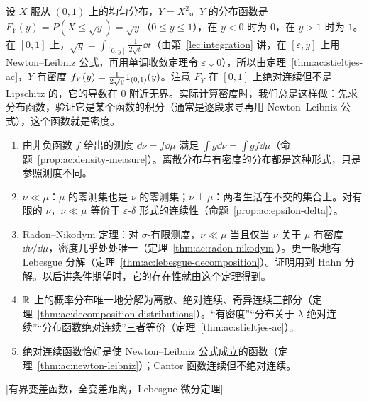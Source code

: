 \begin{example}
设 $X$ 服从 $(0,1)$ 上的均匀分布，$Y=X^2$。$Y$ 的分布函数是 $F_Y(y)=P(X\leqslant\sqrt y)=\sqrt y$（$0\leqslant y\leqslant1$），在 $y<0$ 时为 $0$，在 $y>1$ 时为 $1$。在 $[0,1]$ 上，$\sqrt y=\int_{[0,y]}\frac1{2\sqrt t}\dd t$（由第~\ref{lec:integration} 讲，在 $[\varepsilon,y]$ 上用 Newton--Leibniz 公式，再用单调收敛定理令 $\varepsilon\downarrow0$），所以由定理~\ref{thm:ac:stieltjes-ac}，$Y$ 有密度 $f_Y(y)=\frac1{2\sqrt y}1_{(0,1)}(y)$。注意 $F_Y$ 在 $[0,1]$ 上绝对连续但不是 Lipschitz 的，它的导数在 $0$ 附近无界。实际计算密度时，我们总是这样做：先求分布函数，验证它是某个函数的积分（通常是逐段求导再用 Newton--Leibniz 公式），这个函数就是密度。
\end{example}


\begin{enumerate}
\item 由非负函数 $f$ 给出的测度 $\dd\nu=f\dd\mu$ 满足 $\int g\dd\nu=\int gf\dd\mu$（命题~\ref{prop:ac:density-measure}）。离散分布与有密度的分布都是这种形式，只是参照测度不同。
\item $\nu\ll\mu$：$\mu$ 的零测集也是 $\nu$ 的零测集；$\nu\perp\mu$：两者生活在不交的集合上。对有限的 $\nu$，$\nu\ll\mu$ 等价于 $\varepsilon$-$\delta$ 形式的连续性（命题~\ref{prop:ac:epsilon-delta}）。
\item Radon--Nikodym 定理：对 $\sigma$-有限测度，$\nu\ll\mu$ 当且仅当 $\nu$ 关于 $\mu$ 有密度 $\dd\nu/\dd\mu$，密度几乎处处唯一（定理~\ref{thm:ac:radon-nikodym}）。更一般地有 Lebesgue 分解（定理~\ref{thm:ac:lebesgue-decomposition}）。证明用到 Hahn 分解。以后讲条件期望时，它的存在性就由这个定理得到。
\item $\mathbb{R}$ 上的概率分布唯一地分解为离散、绝对连续、奇异连续三部分（定理~\ref{thm:ac:decomposition-distributions}）。“有密度”“分布关于 $\lambda$ 绝对连续”“分布函数绝对连续”三者等价（定理~\ref{thm:ac:stieltjes-ac}）。
\item 绝对连续函数恰好是使 Newton--Leibniz 公式成立的函数（定理~\ref{thm:ac:newton-leibniz}）；Cantor 函数连续但不绝对连续。
\end{enumerate}

[有界变差函数，全变差距离，Lebesgue 微分定理]
\label{hw:absolute-continuity}


